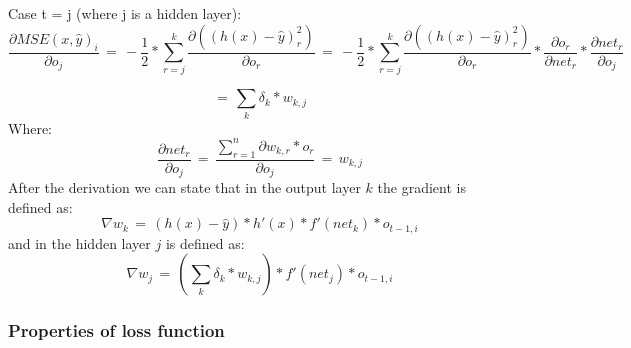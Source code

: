 Case t = j (where j is a hidden layer):
\begin{equation*}
\frac{\partial MSE(x, \hat{y})_i}{\partial o_{j}} \,
 = \, -\frac{1}{2} * \sum_{r=j}^k\frac{ \partial((h(x) - \widehat{y})_{r}^2)}{\partial o_{r}} \, 
= \, -\frac{1}{2} * \sum_{r=j}^k\frac{ \partial((h(x) - \widehat{y})_{r}^2)}{\partial o_{r}} * \frac{\partial o_{r}}{\partial net_{r}} * \frac{\partial net_{r}}{\partial o_{j}}
\end{equation*}

\begin{equation}
\label{retropagation}
= \, \sum_{k} \delta_{k} * w_{k,j}
\end{equation}
Where:
\begin{equation*}
\frac{\partial net_{r}}{\partial o_{j}} \, = \, \frac{\sum_{r=1}^n\partial w_{k,r}*o_{r}}{\partial o_{j}} \, = \,  w_{k,j}
\end{equation*}
After the derivation we can state that in the output layer $k$ the gradient is defined as: 
\begin{equation}
\label{partialOutput}
\nabla w_{k} \, = \, (h(x)-\hat{y}) * h'(x) * f'(net_{k})  * o_{t-1,i}
\end{equation}
and in the hidden layer $j$ is defined as:
\begin{equation}
\label{partialHidden}
\nabla w_{j} \, = \, (\sum_{k} \delta_{k} * w_{k,j}) * f'(net_{j}) * o_{t-1,i}
\end{equation}

\subsubsection{Properties of loss function}
